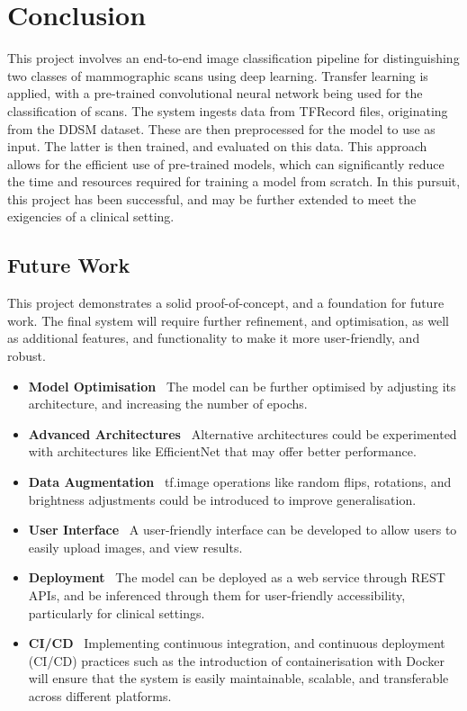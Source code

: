\documentclass[../main]{subfiles}
\begin{document}
\chapter{Conclusion}
This project involves an end-to-end image classification pipeline for distinguishing two classes of mammographic scans using deep learning. Transfer learning is applied, with a pre-trained convolutional neural network being used for the classification of scans. The system ingests data from TFRecord files, originating from the DDSM dataset. These are then preprocessed for the model to use as input. The latter is then trained, and evaluated on this data. This approach allows for the efficient use of pre-trained models, which can significantly reduce the time and resources required for training a model from scratch. In this pursuit, this project has been successful, and may be further extended to meet the exigencies of a clinical setting.

\section{Future Work}
This project demonstrates a solid proof-of-concept, and a foundation for future work. The final system will require further refinement, and optimisation, as well as additional features, and functionality to make it more user-friendly, and robust.

\begin{itemize}
	\item \textbf{Model Optimisation} \textemdash\ The model can be further optimised by adjusting its architecture, and increasing the number of epochs.
	\item \textbf{Advanced Architectures} \textemdash\ Alternative architectures could be experimented with architectures like EfficientNet that may offer better performance.
	\item \textbf{Data Augmentation} \textemdash\ tf.image operations like random flips, rotations, and brightness adjustments could be introduced to improve generalisation.
	\item \textbf{User Interface} \textemdash\ A user-friendly interface can be developed to allow users to easily upload images, and view results.
	\item \textbf{Deployment} \textemdash\ The model can be deployed as a web service through REST APIs, and be inferenced through them for user-friendly accessibility, particularly for clinical settings.
	\item \textbf{CI/CD} \textemdash\ Implementing continuous integration, and continuous deployment (CI/CD) practices such as the introduction of containerisation with Docker will ensure that the system is easily maintainable, scalable, and transferable across different platforms.
\end{itemize}
\end{document}
